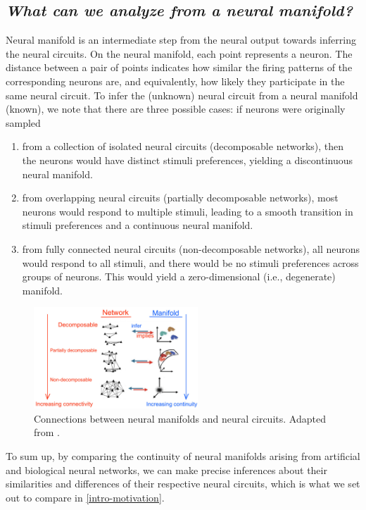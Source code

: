 \subsection{\textit{What can we analyze from a neural manifold?}}
\label{intro-network-manifold}
Neural manifold is an intermediate step from the neural output towards inferring the neural circuits. On the neural manifold, each point represents a neuron. The distance between a pair of points indicates how similar the firing patterns of the corresponding neurons are, and equivalently, how likely they participate in the same neural circuit. To infer the (unknown) neural circuit from a neural manifold (known), we note that there are three possible cases: if neurons were originally sampled 
\begin{enumerate}[noitemsep,topsep=0pt]
    \item from a collection of isolated neural circuits (decomposable networks), then the neurons would have distinct stimuli preferences, yielding a discontinuous neural manifold.
    \item from overlapping neural circuits (partially decomposable networks), most neurons would respond to multiple stimuli, leading to a smooth transition in stimuli preferences and a continuous neural manifold. 
    \item from fully connected neural circuits (non-decomposable networks),  all neurons would respond to all stimuli, and there would be no stimuli preferences across groups of neurons. This would yield a zero-dimensional (i.e., degenerate) manifold.
\end{enumerate}

\begin{figure}[H]
\label{networks-manifolds}
\centering
    \includegraphics[width=0.55\textwidth]{figures/intro/networks-manifolds.jpg}
    \caption{Connections between neural manifolds and neural circuits. Adapted from \cite{dyballa_manifold_2021}.}
\end{figure} 
To sum up, by comparing the continuity of neural manifolds arising from artificial and biological neural networks, we can make precise inferences about their similarities and differences of their respective neural circuits, which is what we set out to compare in \ref{intro-motivation}.


